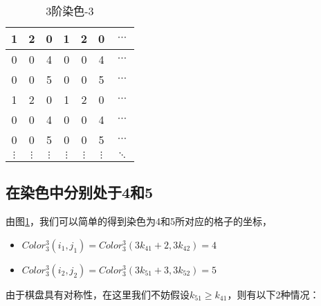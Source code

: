 \begin{table}[htbp]
	\centering
	\caption{3阶染色-3}
	\begin{tabular}{|c|c|c|c|c|c|c|}
		\hline
		1        & 2        & 0        & 1        & 2        & 0        & $\cdots$ \\
		\hline
		0        & 0        & 4        & 0        & 0        & 4        & $\cdots$ \\
		\hline
		0        & 0        & 5        & 0        & 0        & 5        & $\cdots$ \\
		\hline
		1        & 2        & 0        & 1        & 2        & 0        & $\cdots$ \\
		\hline
		0        & 0        & 4        & 0        & 0        & 4        & $\cdots$ \\
		\hline
		0        & 0        & 5        & 0        & 0        & 5        & $\cdots$ \\
		\hline
		$\vdots$ & $\vdots$ & $\vdots$ & $\vdots$ & $\vdots$ & $\vdots$ & $\ddots$ \\
		\hline
	\end{tabular}
	\label{fig:3-order-staining-last}
\end{table}

\subsection{在染色中分别处于4和5}

由图\ref{fig:3-order-staining-last}，我们可以简单的得到染色为4和5所对应的格子的坐标，

\begin{itemize}
	\item $Color^3_3(i_1, j_1) = Color^3_3(3k_{41} + 2, 3k_{42}) = 4$
	\item $Color^3_3(i_2, j_2) = Color^3_3(3k_{51} + 3, 3k_{52}) = 5$
\end{itemize}

由于棋盘具有对称性，在这里我们不妨假设$k_{51} \ge k_{41}$，则有以下2种情况：

